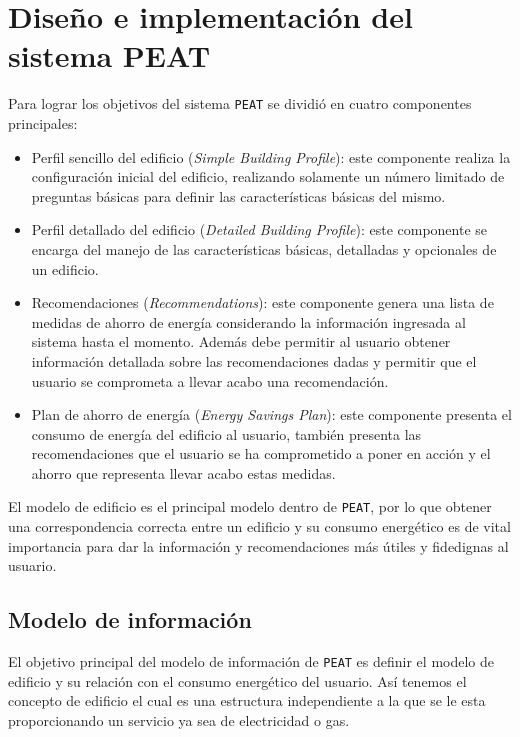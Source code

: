 \chapter{Diseño e implementación del sistema PEAT}

Para lograr los objetivos del sistema \texttt{PEAT} se dividió en cuatro
componentes principales:

\begin{itemize}
\item Perfil sencillo del edificio (\textit{Simple Building Profile}): este
  componente realiza la configuración inicial del edificio, realizando solamente
  un número limitado de preguntas básicas para definir las características básicas
  del mismo.
\item Perfil detallado del edificio (\textit{Detailed Building Profile}):
  este componente se encarga del manejo de las características básicas, detalladas y
  opcionales de un edificio.
\item Recomendaciones (\textit{Recommendations}): este componente genera una lista
  de medidas de ahorro de energía considerando la información ingresada al sistema
  hasta el momento. Además debe permitir al usuario obtener información detallada
  sobre las recomendaciones dadas y permitir que el usuario se comprometa a
  llevar acabo una recomendación.
\item Plan de ahorro de energía (\textit{Energy Savings Plan}): este componente
  presenta el consumo de energía del edificio al usuario, también presenta las
  recomendaciones que el usuario se ha comprometido a poner en acción y el
  ahorro que representa llevar acabo estas medidas.
\end{itemize}

El  modelo de edificio es el principal modelo dentro de \texttt{PEAT}, por lo que
obtener una correspondencia correcta entre un edificio y su consumo energético
es de vital importancia para dar la información y recomendaciones más útiles y
fidedignas al usuario.

\section{Modelo de información}

El objetivo principal del modelo de información de \texttt{PEAT} es definir el
modelo de edificio y su relación con el consumo energético del usuario. Así
tenemos el concepto de edificio el cual es una estructura independiente a la
que se le esta proporcionando un servicio ya sea de electricidad o gas.

